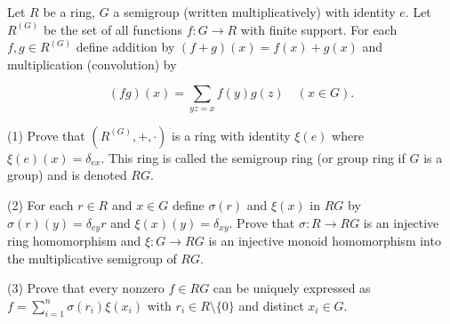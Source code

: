 Let $R$ be a ring, $G$ a semigroup (written multiplicatively) with identity $e$. Let $R^{(G)}$ be the set of all functions $f: G \to R$ with finite support. For each $f,g \in R^{(G)}$ define addition by $(f+g)(x) = f(x) + g(x)$ and multiplication (convolution) by

$$(fg)(x) = \sum_{yz = x} f(y)g(z) \quad (x \in G).$$

(1) Prove that $(R^{(G)}, +, \cdot)$ is a ring with identity $\xi(e)$ where $\xi(e)(x) = \delta_{ex}$. This ring is called the semigroup ring (or group ring if $G$ is a group) and is denoted $RG$.

(2) For each $r \in R$ and $x \in G$ define $\sigma(r)$ and $\xi(x)$ in $RG$ by $\sigma(r)(y) = \delta_{ey}r$ and $\xi(x)(y) = \delta_{xy}$. Prove that $\sigma: R \to RG$ is an injective ring homomorphism and $\xi: G \to RG$ is an injective monoid homomorphism into the multiplicative semigroup of $RG$.

(3) Prove that every nonzero $f \in RG$ can be uniquely expressed as $f = \sum_{i=1}^{n} \sigma(r_i)\xi(x_i)$ with $r_i \in R \setminus \{0\}$ and distinct $x_i \in G$.
